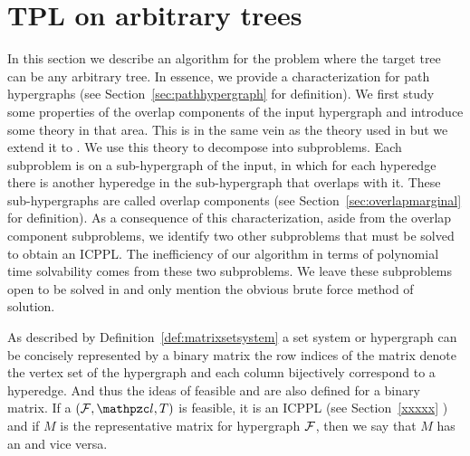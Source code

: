 \section{ TPL on arbitrary trees}
\label{sec:norestraint}

In this section we describe an algorithm for the \CFTPL problem where
the target tree can be any arbitrary tree. In essence, we provide a
characterization for path hypergraphs (see
Section~\ref{sec:pathhypergraph} for definition).  We first study some
properties of the overlap components of the input hypergraph and
introduce some theory in that area. This is in the same vein as the
theory used in \cite{wlh02,nsnrs09} but we extend it to \TPL.  We use
this theory to decompose \CFTPL into subproblems.  Each subproblem is
on a sub-hypergraph of the input, in which for each hyperedge there is
another hyperedge in the sub-hypergraph that overlaps with it. These
sub-hypergraphs are called overlap components (see
Section~\ref{sec:overlapmarginal} for definition). As a consequence of
this characterization, aside from the overlap component subproblems,
we identify two other subproblems that must be solved to obtain an
ICPPL.  The inefficiency of our algorithm in terms of polynomial time
solvability comes from these two subproblems. We leave these subproblems
open to be solved in \p and only mention the obvious brute force
method of solution.





As described by Definition~\ref{def:matrixsetsystem} a set system or
hypergraph can be concisely represented by a binary matrix
\stt the row indices of the matrix denote the vertex set of the
hypergraph and each column bijectively correspond to a hyperedge. And
thus the ideas of feasible \TPL and \ICPPL are also defined for a
binary matrix. If a \TPL $(\cF,\cl,T)$ is feasible, \ie it is an ICPPL
(see Section~\ref{xxxxx} ) and if $M$ is
the representative matrix for hypergraph ${\cal F}$, then we say that $M$
has an \ICPPL and vice versa.


